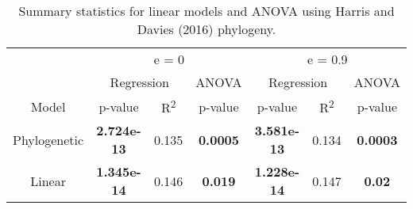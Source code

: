 \documentclass[]{article}
\begin{document}
\begin{table}[H]

\caption{\label{tab:unnamed-chunk-43}Summary statistics for linear models and ANOVA using Harris and Davies (2016) phylogeny.}
\centering
\begin{tabular}{c|c|c|c|c|c|c}
\hline
\multicolumn{1}{c|}{ } & \multicolumn{3}{c|}{e = 0} & \multicolumn{3}{c}{e = 0.9} \\
\cline{2-4} \cline{5-7}
\multicolumn{1}{c|}{ } & \multicolumn{2}{c|}{Regression} & \multicolumn{1}{c|}{ANOVA} & \multicolumn{2}{c|}{Regression} & \multicolumn{1}{c}{ANOVA} \\
\cline{2-3} \cline{4-4} \cline{5-6} \cline{7-7}
Model & p-value & R\textsuperscript{2} & p-value & p-value & R\textsuperscript{2} & p-value\\
\hline
Phylogenetic & \textbf{2.724e-13} & 0.135 & \textbf{0.0005} & \textbf{3.581e-13} & 0.134 & \textbf{0.0003}\\
\hline
Linear & \textbf{1.345e-14} & 0.146 & \textbf{0.019} & \textbf{1.228e-14} & 0.147 & \textbf{0.02}\\
\hline
\end{tabular}
\end{table}
\end{document}

